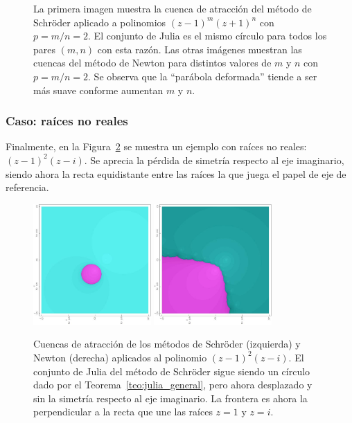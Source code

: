 \begin{figure}[H]
\caption{La primera imagen muestra la cuenca de atracción del método de Schröder aplicado a polinomios $(z-1)^m(z+1)^n$ con $p=m/n=2$. El conjunto de Julia es el mismo círculo para todos los pares $(m,n)$ con esta razón. Las otras imágenes muestran las cuencas del método de Newton para distintos valores de $m$ y $n$ con $p=m/n=2$. Se observa que la ``parábola deformada'' tiende a ser más suave conforme aumentan $m$ y $n$.}
\label{fig:p_constante}
\end{figure}

\subsubsection{Caso: raíces no reales}

Finalmente, en la Figura~\ref{fig:raices_complejas} se muestra un ejemplo con raíces no reales: $(z-1)^2(z-i)$. Se aprecia la pérdida de simetría respecto al eje imaginario, siendo ahora la recta equidistante entre las raíces la que juega el papel de eje de referencia.

\begin{figure}[H]
\centering 
\includegraphics[width=0.4\textwidth]{fuentes/articulo-cuadraticos/imagenes/sch-i_m2_n1.jpg}\quad 
\includegraphics[width=0.4\textwidth]{fuentes/articulo-cuadraticos/imagenes/newton1-i_m2_n1.jpg}
\caption{Cuencas de atracción de los métodos de Schröder (izquierda) y Newton (derecha) aplicados al polinomio $(z-1)^2(z-i)$. El conjunto de Julia del método de Schröder sigue siendo un círculo dado por el Teorema~\ref{teo:julia_general}, pero ahora desplazado y sin la simetría respecto al eje imaginario. La frontera es ahora la perpendicular a la recta que une las raíces $z=1$ y $z=i$.}
\label{fig:raices_complejas}
\end{figure}

